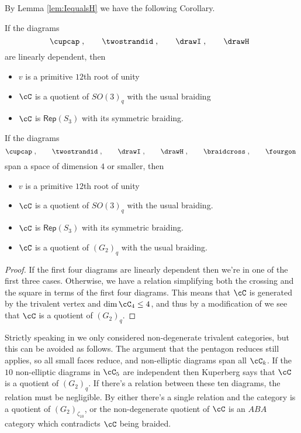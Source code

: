 \documentclass[12pt]{amsart}
\begin{document}
By Lemma \ref{lem:IequalsH} we have the following Corollary.

\begin{corollary}
If the diagrams   
  \[
  \cupcap\;,\qquad\twostrandid\;,
    \qquad\drawI\;,\qquad\drawH\;\;
   \]
are linearly dependent, then
\begin{itemize}
\item $v$ is a primitive $12$th root of unity
\item $\cC$ is a quotient of $SO(3)_q$ with the usual braiding
\item $\cC$ is $\mathsf{Rep}(S_3)$ with its symmetric braiding.
\end{itemize}
\end{corollary}


\begin{proposition} \label{prop:dim4}
If the diagrams  
  \[
  \cupcap\;,\qquad\twostrandid\;,
    \qquad\drawI\;,\qquad\drawH\;,\qquad\braidcross\;,\qquad\fourgon\;
   \]
span a space of dimension $4$ or smaller, then
\begin{itemize}
\item $v$ is a primitive $12$th root of unity
\item $\cC$ is a quotient of $SO(3)_q$ with the usual braiding.
\item $\cC$ is $\mathsf{Rep}(S_3)$ with its symmetric braiding.
\item $\cC$ is a quotient of $(G_2)_q$ with the usual braiding.  
\end{itemize}
\end{proposition}
\begin{proof}
If the first four diagrams are linearly dependent then we're in one of the
first three cases.  Otherwise, we have a relation simplifying both the
crossing and the square in terms of the first four diagrams.  This means that
$\cC$ is generated by the trivalent vertex and $\dim \cC_4 \leq 4$, and thus
by a modification of \cite[\S 5]{MR3624901} we see that $\cC$ is a
quotient of $(G_2)_q$.
\end{proof}

\begin{remark}
Strictly speaking in \cite{MR3624901} we only considered non-degenerate trivalent categories, but this can be avoided as follows.  The argument that the pentagon reduces still applies, so all small faces reduce, and non-elliptic diagrams span all $\cC_k$.  If the $10$ non-elliptic diagrams in $\cC_5$ are independent then Kuperberg \cite{MR1265145} says that $\cC$ is a quotient of $(G_2)_q$.  If there's a relation between these ten diagrams, the relation must be negligible.  By \cite{MR3624901} either there's a single relation and the category is a quotient of $(G_2)_{\zeta_{10}}$, or the non-degenerate quotient of $\cC$ is an $ABA$ category which contradicts $\cC$ being braided.
\end{remark}
\end{document}
